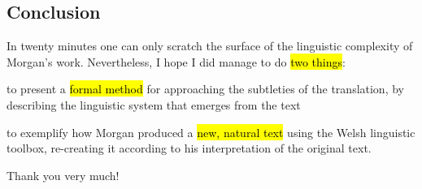 \begin{paper}
	\section{Conclusion}

	In twenty minutes one can only scratch the surface of the linguistic complexity of Morgan’s work. Nevertheless, I hope I did manage to do \hl{two things}:
	\begin{compactitem}
		\item to present a \hl{formal method} for approaching the subtleties of the translation, by describing the linguistic system that emerges from the text
		\item to exemplify how Morgan produced a \hl{new, natural text} using the Welsh linguistic toolbox, re-creating it according to his interpretation of the original text.
	\end{compactitem}

	Thank you very much!
\end{paper}
